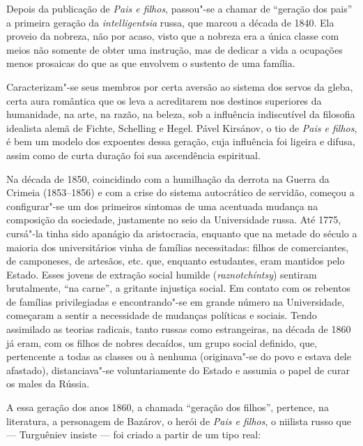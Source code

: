 Depois da publicação de \emph{Pais e filhos}, passou"-se a chamar de
``geração dos pais'' a primeira geração da \emph{intelligentsia} russa,
que marcou a década de 1840. Ela proveio da nobreza, não por acaso,
visto que a nobreza era a única classe com meios não somente de obter
uma instrução, mas de dedicar a vida a ocupações menos prosaicas do que
as que envolvem o sustento de uma família.

Caracterizam"-se seus membros por certa aversão ao sistema dos servos
da gleba, certa aura romântica que os leva a acreditarem nos
destinos superiores da humanidade, na arte, na razão, na beleza, sob a influência indiscutível da filosofia idealista alemã de Fichte, Schelling e Hegel. Pável Kirsánov, o tio de \emph{Pais e filhos}, é bem um modelo dos expoentes dessa geração, cuja influência foi ligeira e difusa, assim como de curta duração foi sua ascendência espiritual.

Na década de 1850, coincidindo com a humilhação da derrota na Guerra da Crimeia (1853--1856) e
com a crise do sistema autocrático de servidão, começou a configurar"-se
um dos primeiros sintomas de uma acentuada mudança na composição da
sociedade, justamente no seio da Universidade russa. Até 1775, cursá"-la tinha
sido apanágio da aristocracia, enquanto que na metade do século  a
maioria dos universitários vinha de famílias necessitadas:
filhos de comerciantes, de camponeses, de artesãos, etc. que,
enquanto estudantes, eram mantidos pelo Estado. Esses jovens de extração
social humilde (\emph{raznotchíntsy}) sentiram brutalmente, ``na carne'', a
gritante injustiça social. Em contato com os rebentos de famílias
privilegiadas e encontrando"-se em grande número na Universidade,
começaram a sentir a necessidade de mudanças políticas e sociais.
Tendo assimilado as teorias radicais, tanto russas como estrangeiras, na
década de 1860 já eram, com os filhos de nobres decaídos, um grupo social definido, que,
pertencente a todas as classes ou à nenhuma (originava"-se do povo e estava dele afastado), distanciava"-se
voluntariamente do Estado e assumia o papel de curar os males da
Rússia.

A essa geração dos anos 1860, a chamada ``geração dos filhos'', pertence, na literatura, a personagem de Bazárov, o herói de \emph{Pais
e filhos}, o niilista russo que --- Turguêniev insiste --- foi criado a
partir de um tipo real:

